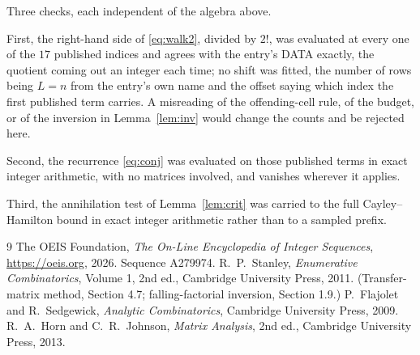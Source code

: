 \documentclass[11pt,a4paper]{article}
\theoremstyle{plain}
\theoremstyle{definition}
\begin{document}
Three checks, each independent of the algebra above.

First, the right-hand side of \eqref{eq:walk2}, divided by $2!$, was evaluated at every
one of the $17$ published indices and agrees with the entry's DATA exactly, the quotient
coming out an integer each time; no shift was fitted, the number of rows being
$L=n$ from the entry's own name and the offset saying which index the first published
term carries. A misreading of the offending-cell rule, of the budget, or of the inversion in
Lemma~\ref{lem:inv} would change the counts and be rejected here.

Second, the recurrence \eqref{eq:conj} was evaluated on those published terms in exact
integer arithmetic, with no matrices involved, and vanishes wherever it applies.

Third, the annihilation test of Lemma~\ref{lem:crit} was carried to the full
Cayley--Hamilton bound in exact integer arithmetic rather than to a sampled prefix.

\begin{thebibliography}{9}
 The OEIS Foundation, \emph{The On-Line Encyclopedia of Integer
Sequences}, \url{https://oeis.org}, 2026. Sequence A279974.
 R.~P.~Stanley, \emph{Enumerative Combinatorics}, Volume 1, 2nd ed.,
Cambridge University Press, 2011. (Transfer-matrix method, Section 4.7; falling-factorial
inversion, Section 1.9.)
 P.~Flajolet and R.~Sedgewick, \emph{Analytic Combinatorics}, Cambridge
University Press, 2009.
 R.~A.~Horn and C.~R.~Johnson, \emph{Matrix Analysis}, 2nd ed., Cambridge
University Press, 2013.
\end{thebibliography}
\end{document}
